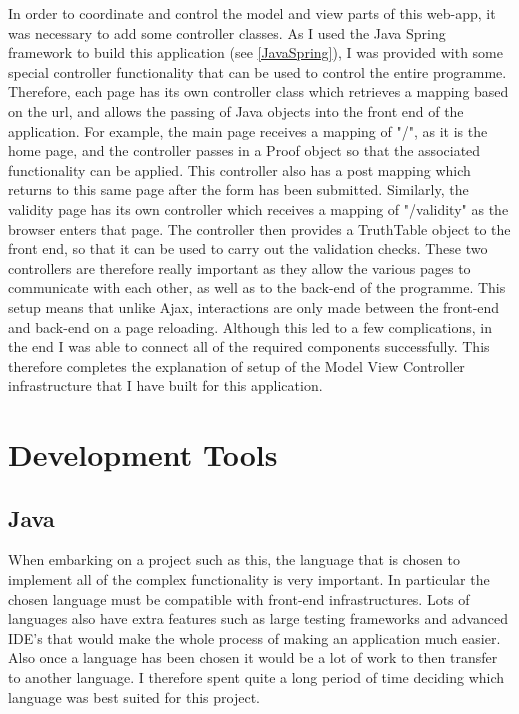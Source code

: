 In order to coordinate and control the model and view parts of this web-app, it was necessary to add some controller classes. As I used the Java Spring framework to build this application (see \ref{JavaSpring}), I was provided with some special controller functionality that can be used to control the entire programme. Therefore, each page has its own controller class which retrieves a mapping based on the url, and allows the passing of Java objects into the front end of the application. For example, the main page receives a mapping of "/", as it is the home page, and the controller passes in a Proof object so that the associated functionality can be applied. This controller also has a post mapping which returns to this same page after the form has been submitted. Similarly, the validity page has its own controller which receives a mapping of "/validity" as the browser enters that page. The controller then provides a TruthTable object to the front end, so that it can be used to carry out the validation checks. These two controllers are therefore really important as they allow the various pages to communicate with each other, as well as to the back-end of the programme. This setup means that unlike Ajax, interactions are only made between the front-end and back-end on a page reloading. Although this led to a few complications, in the end I was able to connect all of the required components successfully. This therefore completes the explanation of setup of the Model View Controller infrastructure that I have built for this application.

\pagebreak

\section{Development Tools}

\subsection{Java}

When embarking on a project such as this, the language that is chosen to implement all of the complex functionality is very important. In particular the chosen language must be compatible with front-end infrastructures. Lots of languages also have extra features such as large testing frameworks and advanced IDE's that would make the whole process of making an application much easier. Also once a language has been chosen it would be a lot of work to then transfer to another language. I therefore spent quite a long period of time deciding which language was best suited for this project.

